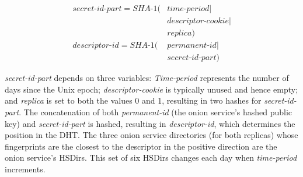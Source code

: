 \begin{equation}
\begin{split}
\textit{secret-id-part} = \textit{SHA-1}(& \textit{time-period} \mid \\
                                         & \textit{descriptor-cookie} \mid \\
                                         & \textit{replica}) \\
\textit{descriptor-id} =  \textit{SHA-1}(& \textit{permanent-id} \mid \\
                                         & \textit{secret-id-part})
\end{split}
\end{equation}

\textit{secret-id-part} depends on three variables:  \textit{Time-period}
represents the number of days since the Unix epoch; \textit{descriptor-cookie}
is typically unused and hence empty; and \textit{replica} is set to both the
values 0 and 1, resulting in two hashes for \textit{secret-id-part}.  The
concatenation of both \textit{permanent-id} (the onion service's hashed public
key) and \textit{secret-id-part} is hashed, resulting in \textit{descriptor-id},
which determines the position in the DHT.  The three onion service directories
(for both replicas) whose fingerprints are the closest to the descriptor in the
positive direction are the onion service's HSDirs.  This set of six HSDirs
changes each day when \textit{time-period} increments.
